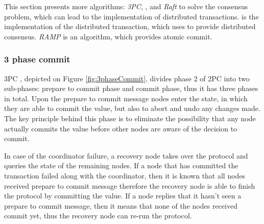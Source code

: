 This section presents more algorithms: \emph{3PC}, \paxos, and \emph{Raft} to solve the consensus problem, which can lead to the implementation of distributed transactions. \lwt is the implementation of the distributed transaction, which uses \paxos to provide distributed consensus. \emph{RAMP} is an algorithm, which provides atomic commit.


\subsubsection{3 phase commit}\label{sec:theory:transactions:3pc}
3PC \cite{3phaseC}, depicted on Figure \ref{fig:3phaseCommit}, divides phase 2 of 2PC into two sub-phases: prepare to commit phase and commit phase, thus it has three phases in total. Upon the prepare to commit message nodes enter the state, in which they are able to commit the value, but also to abort and undo any changes made. The key principle behind this phase is to eliminate the possibility that any node actually commits the value before other nodes are aware of the decision to commit.

In case of the coordinator failure, a recovery node takes over the protocol and queries the state of the remaining nodes. If a node that has committed the transaction failed along with the coordinator, then it is known that all nodes received prepare to commit message therefore the recovery node is able to finish the protocol by committing the value. If a node replies that it hasn't seen a prepare to commit message, then it means that none of the nodes received commit yet, thus the recovery node can re-run the protocol. 

